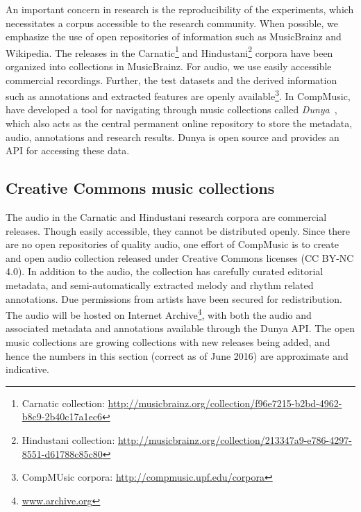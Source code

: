 An important concern in research is the reproducibility of the experiments, which necessitates a corpus accessible to the research community. When possible, we emphasize the use of open repositories of information such as MusicBrainz and Wikipedia. The releases in the Carnatic\footnote{Carnatic collection: \url{http://musicbrainz.org/collection/f96e7215-b2bd-4962-b8c9-2b40c17a1ec6}} and Hindustani\footnote{Hindustani collection: \url{http://musicbrainz.org/collection/213347a9-e786-4297-8551-d61788c85c80}} corpora have been organized into collections in MusicBrainz. For audio, we use easily accessible commercial recordings. Further, the test datasets and the derived information such as annotations and extracted features are openly available\footnote{CompMUsic corpora: \url{http://compmusic.upf.edu/corpora}}. In CompMusic, have developed a tool for navigating through music collections called \textit{Dunya}~\cite{porter:13:dunya}, which also acts as the central permanent online repository to store the metadata, audio, annotations and research results. Dunya is open source and provides an API for accessing these data. 
%
\subsection{Creative Commons music collections}\label{sec:cmccdataset}
The audio in the Carnatic and Hindustani research corpora are commercial releases. Though easily accessible, they cannot be distributed openly. Since there are no open repositories of quality audio, one effort of CompMusic is to create and open audio collection released under Creative Commons licenses (CC BY-NC 4.0). In addition to the audio, the collection has carefully curated editorial metadata, and semi-automatically extracted melody and rhythm related annotations. Due permissions from artists have been secured for redistribution. The audio will be hosted on Internet Archive\footnote{\url{www.archive.org}}, with both the audio and associated metadata and annotations available through the Dunya API. The open music collections are growing collections with new releases being added, and hence the numbers in this section (correct as of June 2016) are approximate and indicative.

